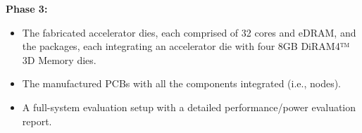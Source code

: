\noindent
\textbf{Phase 3:}
\begin{itemize}
\item The fabricated accelerator dies, each comprised of 32 cores and eDRAM, and the packages, each integrating an accelerator die with four 8GB DiRAM4™ 3D Memory dies.
\item The manufactured PCBs with all the components integrated (i.e., nodes).
\item A full-system evaluation setup with a detailed performance/power evaluation report.
\end{itemize}

